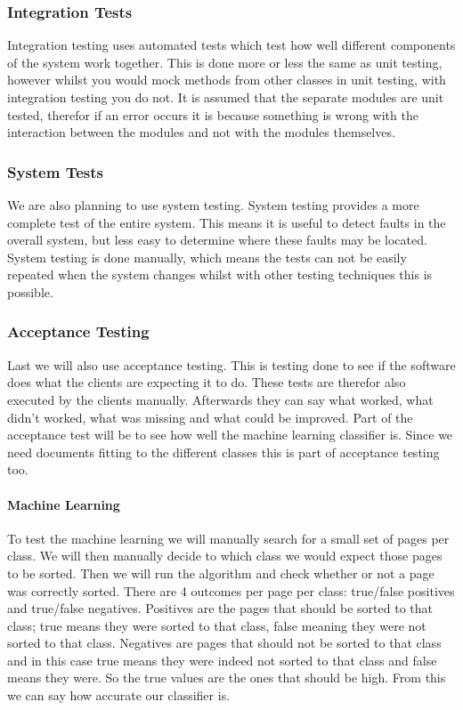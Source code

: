 \subsubsection{Integration Tests}
Integration testing uses automated tests which test how well different components of the system work together. This is done more or less the same as unit testing, however whilst you would mock methods from other classes in unit testing, with integration testing you do not. It is assumed that the separate modules are unit tested, therefor if an error occurs it is because something is wrong with the interaction between the modules and not with the modules themselves. 

\subsubsection{System Tests}
We are also planning to use system testing. System testing provides a more complete test of the entire system. This means it is useful to detect faults in the overall system, but less easy to determine where these faults may be located. System testing is done manually, which means the tests can not be easily repeated when the system changes whilst with other testing techniques this is possible.

\subsubsection{Acceptance Testing}
Last we will also use acceptance testing. This is testing done to see if the software does what the clients are expecting it to do. These tests are therefor also executed by the clients manually. Afterwards they can say what worked, what didn't worked, what was missing and what could be improved. Part of the acceptance test will be to see how well the machine learning classifier is. Since we need documents fitting to the different classes this is part of acceptance testing too.\\

\paragraph{Machine Learning}
To test the machine learning we will manually search for a small set of pages per class. We will then manually decide to which class we would expect those pages to be sorted. Then we will run the algorithm and check whether or not a page was correctly sorted. There are 4 outcomes per page per class: true/false positives and true/false negatives. Positives are the pages that should be sorted to that class; true means they were sorted to that class, false meaning they were not sorted to that class. Negatives are pages that should not be sorted to that class and in this case true means they were indeed not sorted to that class and false means they were. So the true values are the ones that should be high. From this we can say how accurate our classifier is. 

